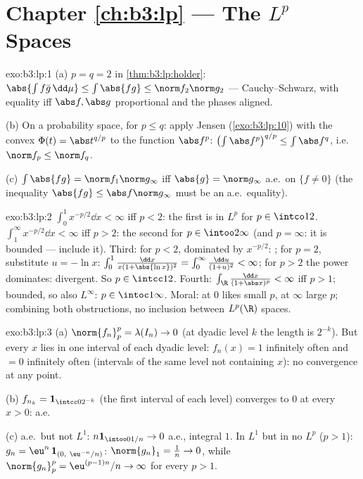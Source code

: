 \section*{Chapter \ref{ch:b3:lp} --- The $L^p$ Spaces}

\begin{solution}{exo:b3:lp:1}
(a) $p = q = 2$ in \cref{thm:b3:lp:holder}: $\abs{\int f\bar
g\,\dd\mu} \leq \int\abs{fg} \leq \norm f_2\norm g_2$ ---
Cauchy--Schwarz, with equality iff $\abs f, \abs g$
proportional and the phases aligned.

(b) On a probability space, for $p \leq q$: apply Jensen
(\cref{exo:b3:lp:10}) with the convex $\Phi(t) =
\abs t^{q/p}$ to the function $\abs f^p$:
$\bigl(\int\abs f^p\bigr)^{q/p} \leq \int\abs f^q$, i.e.\
$\norm f_p \leq \norm f_q$.

(c) $\int\abs{fg} = \norm f_1\norm g_\infty$ iff $\abs{g} =
\norm g_\infty$ a.e.\ on $\{f \neq 0\}$ (the inequality
$\abs{fg} \leq \abs f\norm g_\infty$ must be an a.e.\
equality).
\end{solution}

\begin{solution}{exo:b3:lp:2}
$\int_0^1 x^{-p/2}\dd x < \infty$ iff $p < 2$: the first is in
$L^p$ for $p \in \intco12$. $\int_1^\infty x^{-p/2}\dd x <
\infty$ iff $p > 2$: the second for $p \in \intoo2\infty$ (and
$p = \infty$: it is bounded --- include it). Third: for $p <
2$, dominated by $x^{-p/2}$: ; for $p = 2$,
substitute $u = -\ln x$: $\int_0^1\frac{\dd x}{x(1 + \abs{\ln
x})^2} = \int_0^\infty\frac{\dd u}{(1 + u)^2} < \infty$; for
$p > 2$ the power dominates: divergent. So $p \in \intcc12$.
Fourth: $\int_\R\frac{\dd x}{(1 + \abs x)^p} < \infty$ iff $p >
1$; bounded, so also $L^\infty$: $p \in
\intoc1\infty$. Moral:  at $0$ likes small $p$, at
$\infty$ large $p$; combining both obstructions, no inclusion
between $L^p(\R)$ spaces.
\end{solution}

\begin{solution}{exo:b3:lp:3}
(a) $\norm{f_n}_p^p = \lambda(I_n) \to 0$ (at dyadic level $k$
the length is $2^{-k}$). But every $x$ lies in one interval of
each dyadic level: $f_n(x) = 1$ infinitely often and $= 0$
infinitely often (intervals of the same level not containing
$x$): no convergence at any point.

(b) $f_{n_k} = \mathbf 1_{\intcc0{2^{-k}}}$ (the first interval
of each level) converges to $0$ at every $x > 0$: a.e.

(c) a.e.\ but not $L^1$: $n\mathbf 1_{\intoo0{1/n}} \to 0$
a.e., integral $1$. In $L^1$ but in no $L^p$ ($p > 1$): $g_n =
\eu^n\,\mathbf 1_{(0,\ \eu^{-n}/n)}$: $\norm{g_n}_1 = \frac1n
\to 0$, while $\norm{g_n}_p^p = \eu^{(p-1)n}/n \to \infty$ for
every $p > 1$.
\end{solution}

